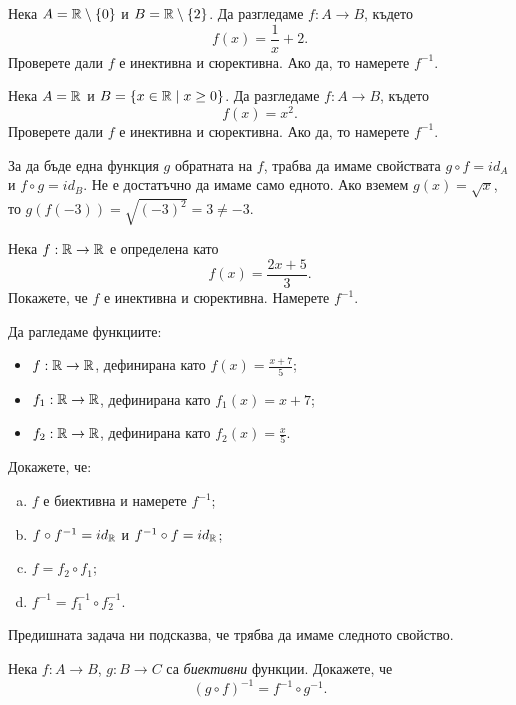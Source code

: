 \begin{problem}
  Нека $A = \mathbb{R} \setminus \{0\}$ и $B = \mathbb{R} \setminus \{2\}$.
  Да разгледаме $f:A \to B$, където
  \[f(x) = \frac{1}{x} + 2.\]
  Проверете дали $f$ е инективна и сюрективна.
  Ако да, то намерете $f^{-1}$.
\end{problem}

\begin{problem}
  Нека $A = \mathbb{R}$ и $B = \{x \in \mathbb{R} \mid x \geq 0\}$.
  Да разгледаме $f:A \to B$, където
  \[f(x) = x^2.\]
  Проверете дали $f$ е инективна и сюрективна.
  Ако да, то намерете $f^{-1}$.
\end{problem}
\begin{hint}
  За да бъде една функция $g$ обратната на $f$,
  трабва да имаме свойствата $g\circ f = id_A$ и $f \circ g = id_B$.
  Не е достатъчно да имаме само едното.
  Ако вземем $g(x) = \sqrt{x}$,  то 
  $g(f(-3)) = \sqrt{(-3)^2} = 3 \neq -3$.
\end{hint}

\begin{problem}
  Нека $f:\mathbb{R} \to \mathbb{R}$ е определена като
  \[f(x) = \frac{2x+5}{3}.\]
  Покажете, че $f$ е инективна и сюрективна.
  Намерете $f^{-1}$.
\end{problem}

\begin{problem}
  Да рагледаме функциите:
  \begin{itemize}
  \item 
    $f:\mathbb{R} \to \mathbb{R}$, дефинирана като $f(x) = \frac{x+7}{5}$;
  \item
    $f_1:\mathbb{R} \to \mathbb{R}$, дефинирана като $f_1(x) = x + 7$;
  \item
    $f_2:\mathbb{R} \to \mathbb{R}$, дефинирана като $f_2(x) = \frac{x}{5}$.
  \end{itemize}
  Докажете, че:
  \begin{enumerate}[a)]
  \item 
    $f$ е биективна и намерете $f^{-1}$;
  \item
    $f\circ f^{-1} = id_{\mathbb{R}}$ и $f^{-1}\circ f = id_{\mathbb{R}}$;
  \item 
    $f = f_2 \circ f_1$;
  \item
    $f^{-1} = f^{-1}_1 \circ f^{-1}_2$.
  \end{enumerate}
\end{problem}

Предишната задача ни подсказва, че трябва да имаме следното свойство.
\begin{problem}
  Нека $f: A\to B$, $g: B\to C$ са {\em биективни} функции.
  Докажете, че
  \[(g\circ f)^{-1} = f^{-1}\circ g^{-1}.\]
\end{problem}




